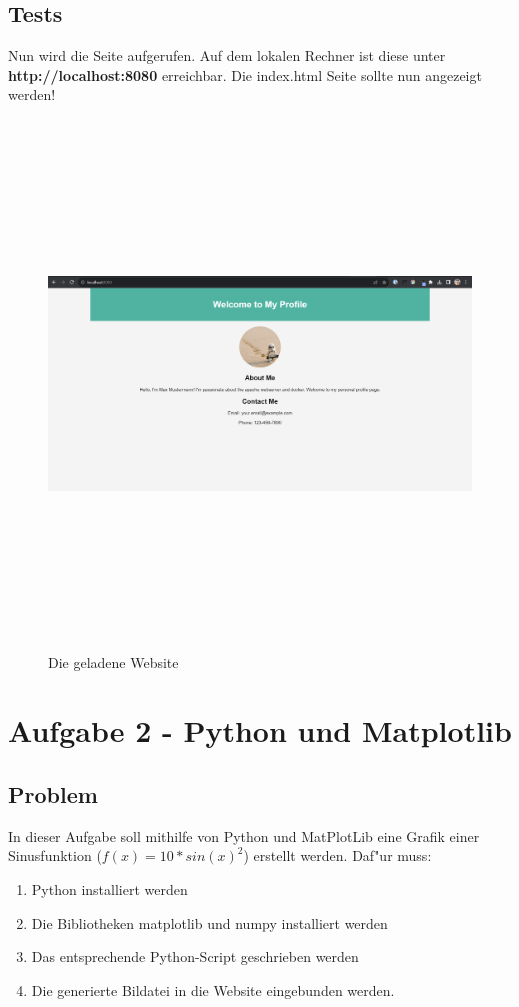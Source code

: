 \documentclass[a4paper,11pt,titlepage]{article}
\begin{document}
    \subsection{Tests}
    Nun wird die Seite aufgerufen. Auf dem lokalen Rechner ist diese unter \textbf{http://localhost:8080} erreichbar. Die index.html Seite sollte nun angezeigt werden!
    \begin{figure}[h]
        \centering
        \includegraphics[width=15cm,height=14cm,keepaspectratio]{./images/screen}
        \caption{Die geladene Website}
        \label{fig:screen}
    \end{figure}


    \section{Aufgabe 2 - Python und Matplotlib}

    \subsection{Problem}
    In dieser Aufgabe soll mithilfe von Python und MatPlotLib eine Grafik einer Sinusfunktion ($f(x) = 10 * sin(x)^2$) erstellt werden.
    Daf"ur muss:
    \begin{enumerate}
        \item Python installiert werden
        \item Die Bibliotheken matplotlib und numpy installiert werden
        \item Das entsprechende Python-Script geschrieben werden
        \item Die generierte Bildatei in die Website eingebunden werden.
    \end{enumerate}
\end{document}
